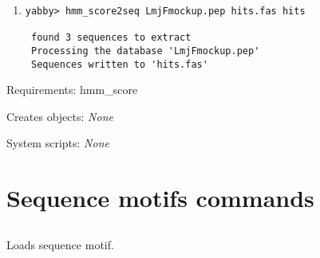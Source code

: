 \begin{description}
\begin{enumerate}
\item
\begin{verbatim}
yabby> hmm_score2seq LmjFmockup.pep hits.fas hits

 found 3 sequences to extract
 Processing the database 'LmjFmockup.pep'
 Sequences written to 'hits.fas'

\end{verbatim}

\end{enumerate}


\item{Requirements:} hmm\_score


\item{Creates objects:} {\em None}


\item{System scripts:} {\em None}

\end{description}


\section{Sequence motifs commands}


\subsection[motif\_load]{  }



Loads sequence motif.


